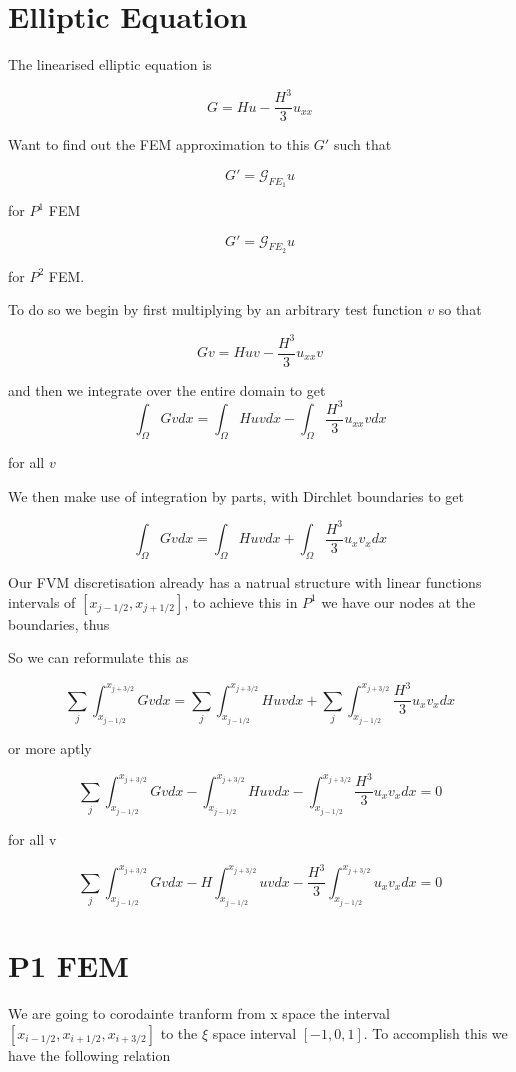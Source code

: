 \documentclass[12pt]{article}
\begin{document}
\section{Elliptic Equation}
The linearised elliptic equation is

\[G = Hu - \frac{H^3}{3}u_{xx}\]

Want to find out the FEM approximation to this $G'$ such that

\[G' = \mathcal{G}_{FE_1} u\]

for $P^1$ FEM

\[G' = \mathcal{G}_{FE_2} u\]

for $P^2$ FEM.

To do so we begin by first multiplying by an arbitrary test function $v$ so that

\[Gv = Huv - \frac{H^3}{3}u_{xx}v\]

and then we integrate over the entire domain to get 
\[\int_\Omega Gv dx = \int_\Omega Huv dx - \int_\Omega \frac{H^3}{3}u_{xx}vdx\]

for all $v$

We then make use of integration by parts, with Dirchlet boundaries to get

\[\int_\Omega Gv dx = \int_\Omega Huv dx + \int_\Omega \frac{H^3}{3}u_{x}v_xdx\]

Our FVM discretisation already has a natrual structure with linear functions intervals of $[x_{j- 1/2} , x_{j+1/2}]$, to achieve this in $P^1$ we have our nodes at the boundaries, thus

So we can reformulate this as 

\[\sum_{j}\int_{x_{j-1/2}}^{x_{j+3/2}} Gv dx = \sum_{j}\int_{x_{j-1/2}}^{x_{j+3/2}} Huv dx + \sum_{j}\int_{x_{j-1/2}}^{x_{j+3/2}} \frac{H^3}{3}u_{x}v_{x}dx\]

or more aptly

\[\sum_{j}\int_{x_{j-1/2}}^{x_{j+3/2}} Gv dx - \int_{x_{j-1/2}}^{x_{j+3/2}} Huv dx - \int_{x_{j-1/2}}^{x_{j+3/2}} \frac{H^3}{3}u_{x}v_{x}dx = 0 \]

for all v

\[\sum_{j}\int_{x_{j-1/2}}^{x_{j+3/2}} Gv dx - H\int_{x_{j-1/2}}^{x_{j+3/2}} uv dx -  \frac{H^3}{3}\int_{x_{j-1/2}}^{x_{j+3/2}}u_{x}v_{x}dx = 0 \]

\section{P1 FEM}
We are going to corodainte tranform from x space the interval $[x_{i-1/2},x_{i+1/2} ,x_{i+3/2}]$ to the $\xi$ space interval $[-1,0,1]$. To accomplish this we have the following relation
\end{document}
